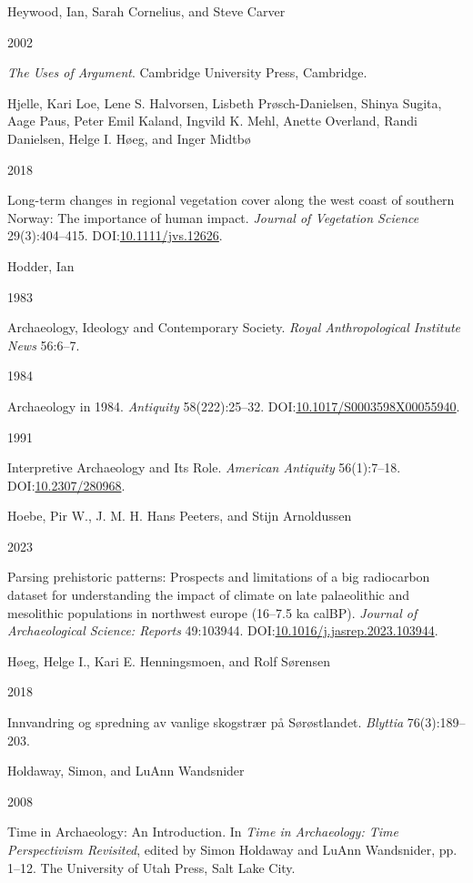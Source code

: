 \documentclass[
  12pt,
  a4paper,
  oneside]{book}
\newlength{\cslhangindent}
\newlength{\csllabelwidth}
\newlength{\cslentryspacingunit} %
\newenvironment{CSLReferences}[2] %
 {%
  \setlength{\parindent}{0pt}
  \ifodd #1
  \let\oldpar\par
  \def\par{\hangindent=\cslhangindent\oldpar}
  \fi
  \setlength{\parskip}{#2\cslentryspacingunit}
 }%
 {}
\newcommand{\CSLBlock}[1]{#1\hfill\break}
\newcommand{\CSLLeftMargin}[1]{\parbox[t]{\csllabelwidth}{#1}}
\newcommand{\CSLRightInline}[1]{\parbox[t]{\linewidth - \csllabelwidth}{#1}\break}
\begin{document}
\begin{CSLReferences}{0}{0}
\leavevmode{}%
\CSLBlock{Heywood, Ian, Sarah Cornelius, and Steve Carver}
\CSLLeftMargin{ 2002}
\CSLRightInline{\emph{{The Uses of Argument}}. Cambridge University Press, Cambridge.}

\leavevmode{}%
\CSLBlock{Hjelle, Kari Loe, Lene S. Halvorsen, Lisbeth Prøsch-Danielsen, Shinya Sugita, Aage Paus, Peter Emil Kaland, Ingvild K. Mehl, Anette Overland, Randi Danielsen, Helge I. Høeg, and Inger Midtbø}
\CSLLeftMargin{ 2018}
\CSLRightInline{{Long-term changes in regional vegetation cover along the west coast of southern Norway: The importance of human impact}. \emph{Journal of Vegetation Science} 29(3):404--415. DOI:\href{https://doi.org/10.1111/jvs.12626}{10.1111/jvs.12626}.}

\leavevmode{}%
\CSLBlock{Hodder, Ian}
\CSLLeftMargin{ 1983}
\CSLRightInline{Archaeology, Ideology and Contemporary Society. \emph{Royal Anthropological Institute News} 56:6--7.}

\leavevmode{}%
\CSLLeftMargin{ 1984 }
\CSLRightInline{Archaeology in 1984. \emph{Antiquity} 58(222):25--32. DOI:\href{https://doi.org/10.1017/S0003598X00055940}{10.1017/S0003598X00055940}.}

\leavevmode{}%
\CSLLeftMargin{ 1991 }
\CSLRightInline{Interpretive Archaeology and Its Role. \emph{American Antiquity} 56(1):7--18. DOI:\href{https://doi.org/10.2307/280968}{10.2307/280968}.}

\leavevmode{}%
\CSLBlock{Hoebe, Pir W., J. M. H. Hans Peeters, and Stijn Arnoldussen}
\CSLLeftMargin{ 2023}
\CSLRightInline{Parsing prehistoric patterns: Prospects and limitations of a big radiocarbon dataset for understanding the impact of climate on late palaeolithic and mesolithic populations in northwest europe (16--7.5 ka calBP). \emph{Journal of Archaeological Science: Reports} 49:103944. DOI:\href{https://doi.org/10.1016/j.jasrep.2023.103944}{10.1016/j.jasrep.2023.103944}.}

\leavevmode{}%
\CSLBlock{Høeg, Helge I., Kari E. Henningsmoen, and Rolf Sørensen}
\CSLLeftMargin{ 2018}
\CSLRightInline{{Innvandring og spredning av vanlige skogstrær på Sørøstlandet}. \emph{Blyttia} 76(3):189--203.}

\leavevmode{}%
\CSLBlock{Holdaway, Simon, and LuAnn Wandsnider}
\CSLLeftMargin{ 2008}
\CSLRightInline{{Time in Archaeology: An Introduction}. In \emph{{Time in Archaeology: Time Perspectivism Revisited}}, edited by Simon Holdaway and LuAnn Wandsnider, pp. 1--12. The University of Utah Press, Salt Lake City.}


\end{CSLReferences}
\end{document}
